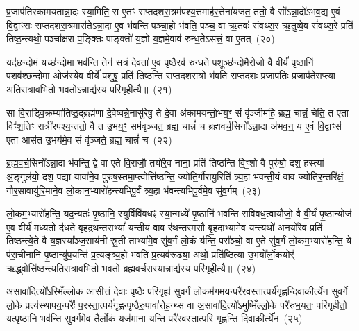 {\anuvakamend[{ग॒च्छ॒न्त्य॒ग्नि॒ष्टुता॑ पा॒प्मान॒न्निर॒न्तरि॑क्षं लो॒कं प्र॒जायै॒ द्वे च॑}]}%

प्र॒जा\-प॑तिरकामयतान्ना॒दः स्या॒मिति॒ स ए॒तꣳ स॑प्तदशरा॒त्रम॑पश्य॒त्तमाह॑र॒त्तेना॑यजत॒ ततो॒ वै सो᳚\-ऽन्ना॒दो॑\-ऽभव॒द्य ए॒वं वि॒द्वाꣳसः॑ सप्तदशरा॒त्रमास॑ते\-ऽन्ना॒दा ए॒व भ॑वन्ति पञ्चा॒हो भ॑वति॒ पञ्च॒ वा ऋ॒तवः॑ संवथ्स॒र ऋ॒तुष्वे॒व सं॑वथ्स॒रे प्रति॑ तिष्ठ॒न्त्यथो॒ पञ्चा᳚क्षरा प॒ङ्क्तिः पाङ्क्तो॑ य॒ज्ञो य॒ज्ञमे॒वाव॑ रुन्ध॒ते\-ऽस॑त्त्रं॒ वा ए॒तत्~(२०)

यद॑छन्दो॒मं यच्छ॑न्दो॒मा भव॑न्ति॒ तेन॑ स॒त्रं दे॒वता॑ ए॒व पृ॒ष्ठैरव॑ रुन्धते प॒शूञ्छ॑न्दो॒मैरोजो॒ वै वी॒र्यं॑ पृ॒ष्ठानि॑ प॒शव॑श्छन्दो॒मा ओज॑स्ये॒व वी॒र्ये॑ प॒शुषु॒ प्रति॑ तिष्ठन्ति सप्तदशरा॒त्रो भ॑वति सप्तद॒शः प्र॒जा\-प॑तिः प्र॒जा\-प॑ते॒राप्त्या॑ अतिरा॒त्राव॒भितो॑ भवतो॒\-ऽन्नाद्य॑स्य॒ परि॑गृहीत्यै॥~(२१)

{\anuvakamend[{ए॒तथ्स॒प्तत्रिꣴ॑श्चच्च}]}%

सा वि॒राड्वि॒क्रम्या॑तिष्ठ॒द्ब्रह्म॑णा दे॒वेष्वन्ने॒नासु॑रेषु॒ ते दे॒वा अ॑कामयन्तो॒भय॒ꣳ॒ सं वृ॑ञ्जीमहि॒ ब्रह्म॒ चान्नं॒ चेति॒ त ए॒ता विꣳ॑श॒तिꣳ रात्री॑रपश्य॒न्ततो॒ वै त उ॒भय॒ꣳ॒ सम॑वृञ्जत॒ ब्रह्म॒ चान्नं॑ च ब्रह्मवर्च॒सिनो᳚\-ऽन्ना॒दा अ॑भव॒न्॒ य ए॒वं वि॒द्वाꣳस॑ ए॒ता आस॑त उ॒भय॑मे॒व सं वृ॑ञ्जते॒ ब्रह्म॒ चान्नं॑ च~(२२)

ब्र॒ह्म॒व॒र्च॒सिनो᳚\-ऽन्ना॒दा भ॑वन्ति॒ द्वे वा ए॒ते वि॒राजौ॒ तयो॑रे॒व नाना॒ प्रति॑ तिष्ठन्ति वि॒ꣳ॒शो वै पुरु॑षो॒ दश॒ हस्त्या॑ अ॒ङ्गुल॑यो॒ दश॒ पद्या॒ यावा॑ने॒व पुरु॑ष॒स्तमा॒प्त्वोत्ति॑ष्ठन्ति॒ ज्योति॒र्गौरायु॒रिति॑ त्र्य॒हा भ॑वन्ती॒यं वाव ज्योति॑र॒न्तरि॑क्षं॒ गौर॒सावायु॑रि॒माने॒व लो॒कान॒भ्यारो॑हन्त्यभिपू॒र्वं त्र्य॒हा भ॑वन्त्यभिपू॒र्वमे॒व सु॑व॒र्गम्~(२३)

लो॒कम॒भ्यारो॑हन्ति॒ यद॒न्यतः॑ पृ॒ष्ठानि॒ स्युर्विवि॑वधꣴ स्या॒न्मध्ये॑ पृ॒ष्ठानि॑ भवन्ति सविवध॒त्वायौजो॒ वै वी॒र्यं॑ पृ॒ष्ठान्योज॑ ए॒व वी॒र्यं॑ मध्य॒तो द॑धते बृहद्रथन्त॒रा\-भ्यां᳚ यन्ती॒यं वाव र॑थन्त॒रम॒सौ बृ॒हदाभ्यामे॒व य॒न्त्यथो॑ अ॒नयो॑रे॒व प्रति॑ तिष्ठन्त्ये॒ते वै य॒ज्ञस्या᳚ञ्ज॒साय॑नी स्रु॒ती ताभ्या॑मे॒व सु॑व॒र्गं लो॒कं य॑न्ति॒ परा᳚ञ्चो॒ वा ए॒ते सु॑व॒र्गं लो॒कम॒भ्यारो॑हन्ति॒ ये प॑रा॒चीना॑नि पृ॒ष्ठान्यु॑प॒यन्ति॑ प्र॒त्यङ्त्र्य॒हो भ॑वति प्र॒त्यव॑रूढ्या॒ अथो॒ प्रति॑ष्ठित्या उ॒भयो᳚र्लो॒कयोर्॑ ऋ॒द्ध्वोत्ति॑ष्ठन्त्यतिरा॒त्राव॒भितो॑ भवतो ब्रह्मवर्च॒सस्या॒न्नाद्य॑स्य॒ परि॑गृहीत्यै॥~(२४)

{\anuvakamend[{वृ॒ञ्ज॒ते॒ ब्रह्म॒ चान्न॑ञ्च सुव॒र्गमे॒ते सु॑व॒र्गन्त्रयो॑विꣳशतिश्च}]}%

अ॒सावा॑दि॒त्यो᳚\-ऽस्मिँल्लो॒क आ॑सी॒त्तं दे॒वाः पृ॒ष्ठैः प॑रि॒गृह्य॑ सुव॒र्गं लो॒कम॑गमय॒न्परै॑र॒वस्ता॒त्पर्य॑गृह्णन्दिवाकी॒र्त्ये॑न सुव॒र्गे लो॒के प्रत्य॑स्थापय॒न्परैः᳚ प॒रस्ता॒त्पर्य॑गृह्णन्पृ॒ष्ठैरु॒पावा॑रोह॒न्थ्स वा अ॒सावा॑दि॒त्यो॑\-ऽमुष्मिँ॑ल्लो॒के परै॑रुभ॒यतः॒ परि॑गृहीतो॒ यत्पृ॒ष्ठानि॒ भव॑न्ति सुव॒र्गमे॒व तैर्लो॒कं यज॑माना यन्ति॒ परै॑र॒वस्ता॒त्परि॑ गृह्णन्ति दिवाकी॒र्त्ये॑न~(२५)

